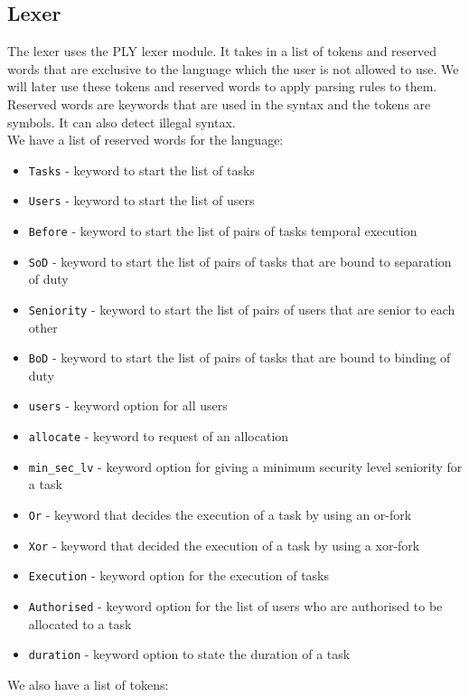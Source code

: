 \documentclass[a4paper]{report}
\begin{document}
\subsection{Lexer}
The lexer uses the PLY lexer module. It takes in a list of tokens and reserved words that are exclusive to the language which the user is not allowed to use. We will later use these tokens and reserved words to apply parsing rules to them. Reserved words are keywords that are used in the syntax and the tokens are symbols. It can also detect illegal syntax.\\
We have a list of reserved words for the language:
\begin{itemize}
\item \texttt{Tasks} - keyword to start the list of tasks
\item \texttt{Users} - keyword to start the list of users
\item \texttt{Before} - keyword to start the list of pairs of tasks temporal execution
\item \texttt{SoD} - keyword to start the list of pairs of tasks that are bound to separation of duty
\item \texttt{Seniority} - keyword to start the list of pairs of users that are senior to each other
\item \texttt{BoD} - keyword to start the list of pairs of tasks that are bound to binding of duty
\item \texttt{users} - keyword option for all users
\item \texttt{allocate} - keyword to request of an allocation
\item \texttt{min\_sec\_lv} - keyword option for giving a minimum security level seniority for a task
\item \texttt{Or} - keyword that decides the execution of a task by using an or-fork
\item \texttt{Xor} - keyword that decided the execution of a task by using a xor-fork
\item \texttt{Execution} - keyword option for the execution of tasks
\item \texttt{Authorised} - keyword option for the list of users who are authorised to be allocated to a task
\item \texttt{duration} - keyword option to state the duration of a task
\end{itemize}
We also have a list of tokens:
\end{document}
